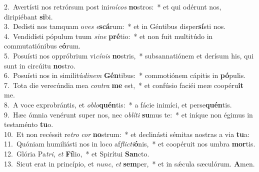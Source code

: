 {2.~}Avertísti nos retrórsum post ini\textit{mí}\textit{cos} \textbf{no}stros:~* et qui odérunt nos, diripiébant \textbf{si}bi.\\
{3.~}Dedísti nos tamquam o\textit{ves} \textit{e}\textbf{scá}rum:~* et in Géntibus disper\textbf{sí}sti nos.\\
{4.~}Vendidísti pópulum tuum \textit{si}\textit{ne} \textbf{pré}tio:~* et non fuit multitúdo in commutatiónibus e\textbf{ó}rum.\\
{5.~}Posuísti nos oppróbrium vi\textit{cí}\textit{nis} \textbf{no}stris,~* subsannatiónem et derísum his, qui sunt in circúitu \textbf{no}stro.\\
{6.~}Posuísti nos in similitú\textit{di}\textit{nem} \textbf{Gén}tibus:~* commotiónem cápitis in \textbf{pó}pulis.\\
{7.~}Tota die verecúndia mea \textit{con}\textit{tra} \textbf{me} est,~* et confúsio faciéi meæ coopéru\textbf{it} me.\\
{8.~}A voce exprobrántis, et \textit{o}\textit{blo}\textbf{quén}tis:~* a fácie inimíci, et perse\textbf{quén}tis.\\
{9.~}Hæc ómnia venérunt super nos, nec o\textit{blí}\textit{ti} \textbf{su}mus te:~* et iníque non égimus in testaménto \textbf{tu}o.\\
{10.~}Et non recéssit re\textit{tro} \textit{cor} \textbf{no}strum:~* et declinásti sémitas nostras a via \textbf{tu}a:\\
{11.~}Quóniam humiliásti nos in loco af\textit{fli}\textit{cti}\textbf{ó}nis,~* et coopéruit nos umbra \textbf{mor}tis.\\
{12.~}Glória Pa\textit{tri}, \textit{et} \textbf{Fí}lio,~* et Spirítui \textbf{San}cto.\\
{13.~}Sicut erat in princípio, et \textit{nunc}, \textit{et} \textbf{sem}per,~* et in sǽcula sæculórum. \textbf{A}men.\\
